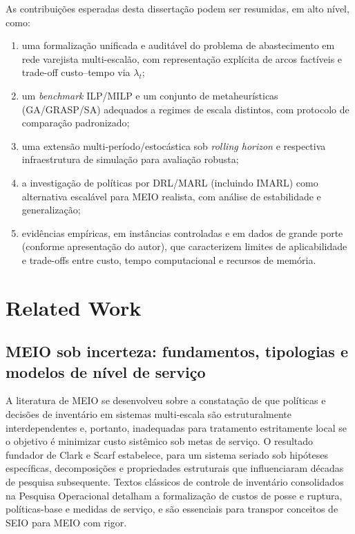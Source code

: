 As contribuições esperadas desta dissertação podem ser resumidas, em alto nível, como:
\begin{enumerate}
    \item uma formalização unificada e auditável do problema de abastecimento em rede varejista multi-escalão, com representação explícita de arcos factíveis e trade-off custo--tempo via \(\lambda_t\);
    \item um \emph{benchmark} ILP/MILP e um conjunto de metaheurísticas (GA/GRASP/SA) adequados a regimes de escala distintos, com protocolo de comparação padronizado;
    \item uma extensão multi-período/estocástica sob \emph{rolling horizon} e respectiva infraestrutura de simulação para avaliação robusta;
    \item a investigação de políticas por DRL/MARL (incluindo IMARL) como alternativa escalável para MEIO realista, com análise de estabilidade e generalização;
    \item evidências empíricas, em instâncias controladas e em dados de grande porte (conforme apresentação do autor), que caracterizem limites de aplicabilidade e trade-offs entre custo, tempo computacional e recursos de memória.
\end{enumerate}

\section{Related Work}

\subsection{MEIO sob incerteza: fundamentos, tipologias e modelos de nível de serviço}

A literatura de MEIO se desenvolveu sobre a constatação de que políticas e decisões de inventário em sistemas multi-escala são estruturalmente interdependentes e, portanto, inadequadas para tratamento estritamente local se o objetivo é minimizar custo sistêmico sob metas de serviço. O resultado fundador de Clark e Scarf estabelece, para um sistema seriado sob hipóteses específicas, decomposições e propriedades estruturais que influenciaram décadas de pesquisa subsequente. \cite{ClarkScarf1960MultiEchelon} Textos clássicos de controle de inventário consolidados na Pesquisa Operacional detalham a formalização de custos de posse e ruptura, políticas-base e medidas de serviço, e são essenciais para transpor conceitos de SEIO para MEIO com rigor. \cite{Axsater2006InventoryControl,Zipkin2000FoundationsInventory}

